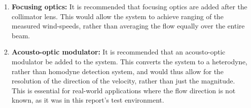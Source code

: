 \begin{enumerate}[label=\textbf{R\arabic*}]
	\item  \textbf{Focusing optics: } It is recommended that focusing optics are added after the collimator lens. This would allow the system to achieve ranging of the measured wind-speeds, rather than averaging the flow equally over the entire beam. \\
	
	\item \textbf{Acousto-optic modulator: } It is recommended that an acousto-optic modulator be added to the system. This converts the system to a heterodyne, rather than homodyne detection system, and would thus allow for the resolution of the direction of the velocity, rather than just the magnitude. This is essential for real-world applications where the flow direction is not known, as it was in this report's test environment.

\end{enumerate}


 

